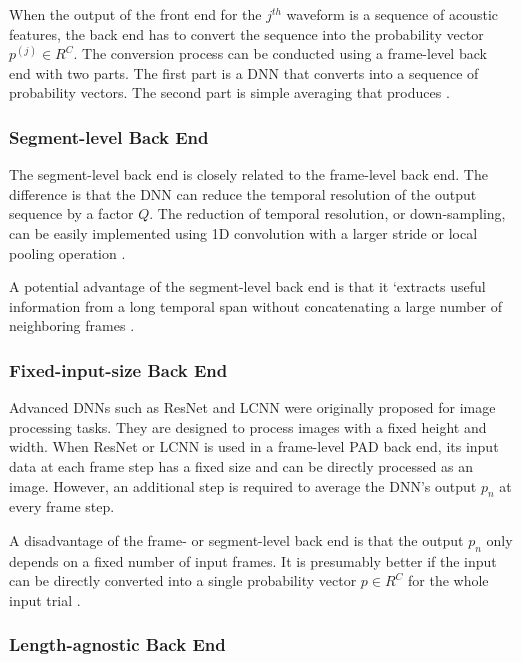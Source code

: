 When the output of the front end for the $j^{th}$ waveform is a sequence of acoustic features, the back end has to convert the sequence into the probability vector $p^{(j)} \in R^{C}$. The conversion process can be conducted using a frame-level back end with two parts. The first part is a DNN that converts into a sequence of probability vectors. The second part is
simple averaging that produces \cite{wang2022practical}.

\subsubsection{Segment-level Back End}

The segment-level back end is closely related to the frame-level back end. The difference is that the DNN can reduce the temporal resolution of the output sequence by a factor $Q$. The reduction of temporal resolution, or down-sampling, can be easily implemented using 1D convolution with a larger stride or local pooling operation \cite{wang2022practical}.

A potential advantage of the segment-level back end is that it ‘extracts useful information from a long temporal span without concatenating a large number of neighboring frames \cite{tian2016spoofing}.

\subsubsection{Fixed-input-size Back End}

Advanced DNNs such as ResNet and LCNN were originally proposed for image processing tasks. They are designed to process images with a fixed height and width. When ResNet or LCNN is used in a frame-level PAD back end, its input data at each frame step has a fixed size and can be directly processed as an image. However, an additional step is required to average the DNN’s output $p_n$ at every frame step.

A disadvantage of the frame- or segment-level back end is that the output $p_n$ only depends on a fixed number of input frames. It is presumably better if the input can be directly converted into a single probability vector $p \in R^{C}$ for the whole input trial \cite{wang2022practical}.

\subsubsection{Length-agnostic Back End}

